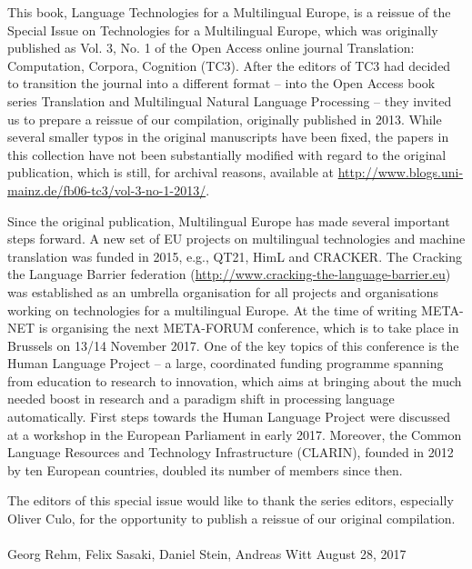 

This book, Language Technologies for a Multilingual Europe, is a reissue of the Special Issue on Technologies for a Multilingual Europe, which was originally published as Vol. 3, No. 1 of the Open Access online journal Translation: Computation, Corpora, Cognition (TC3). After the editors of TC3 had decided to transition the journal into a different format -- into the Open Access book series Translation and Multilingual Natural Language Processing -- they invited us to prepare a reissue of our compilation, originally published in 2013. While several smaller typos in the original manuscripts have been fixed, the papers in this collection have not been substantially modified with regard to the original publication, which is still, for archival reasons, available at \url{http://www.blogs.uni-mainz.de/fb06-tc3/vol-3-no-1-2013/}.

Since the original publication, Multilingual Europe has made several important steps forward. A new set of EU projects on multilingual technologies and machine translation was funded in 2015, e.g., QT21, HimL and CRACKER. The Cracking the Language Barrier federation (\url{http://www.cracking-the-language-barrier.eu}) was established as an umbrella organisation for all projects and organisations working on technologies for a multilingual Europe. At the time of writing META-NET is organising the next META-FORUM conference, which is to take place in Brussels on 13/14 November 2017. One of the key topics of this conference is the Human Language Project -- a large, coordinated funding programme spanning from education to research to innovation, which aims at bringing about the much needed boost in research and a paradigm shift in processing language automatically. First steps towards the Human Language Project were discussed at a workshop in the European Parliament in early 2017. Moreover, the Common Language Resources and Technology Infrastructure (CLARIN), founded in 2012 by ten European countries, doubled its number of members since then.

The editors of this special issue would like to thank the series editors, especially Oliver Culo, for the opportunity to publish a reissue of our original compilation.
\\
\\
\noindent Georg Rehm, Felix Sasaki, Daniel Stein, Andreas Witt \hfill
August 28, 2017

